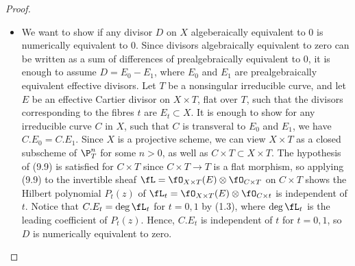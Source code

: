 \documentclass[a4paper]{article}
\begin{document}
\begin{enumerate} [label=\textbf{\arabic*.}, leftmargin=0em]
\begin{proof}
\begin{itemize} [leftmargin=0cm]
                  \item[(c)] We want to show if any divisor $D$ on $X$ algeberaically equivalent to 0 is numerically equivalent to 0.
                        Since divisors algebraically equivalent to zero can be written as a sum of differences of prealgebraically equivalent to 0, it is enough to assume $D = E_0 - E_1$, where $E_0$ and $E_1$ are prealgebraically equivalent effective divisors.
                        Let $T$ be a nonsingular irreducible curve, and let $E$ be an effective Cartier divisor on $X \times T$, flat over $T$, such that the divisors corresponding to the fibres $t$ are $E_t \subset X$.
                        It is enough to show for any irreducible curve $C$ in $X$, such that $C$ is transveral to $E_0$ and $E_1$, we have $C.E_0 = C.E_1$.
                        Since $X$ is a projective scheme, we can view $X \times T$ as a closed subscheme of $\P^n_T$ for some $n > 0$, as well as $C \times T \subset X \times T$.
                        The hypothesis of (9.9) is satisfied for $C \times T$ since $C \times T \to T$ is a flat morphism, so applying (9.9) to the invertible sheaf $\fL = \fO_{X \times T}(E) \otimes \fO_{C \times T}$ on $C \times T$ shows the Hilbert polynomial $P_t(z)$ of $\fL_t = \fO_{X \times T}(E) \otimes \fO_{C \times t}$ is independent of $t$.
                        Notice that $C.E_t = \deg \fL_t$ for $t = 0, 1$ by (1.3), where $\deg \fL_t$ is the leading coefficient of $P_t(z)$.
                        Hence, $C.E_t$ is independent of $t$ for $t = 0, 1$, so $D$ is numerically equivalent to zero.
              \end{itemize}
          \end{proof}


\end{enumerate}
\end{document}
